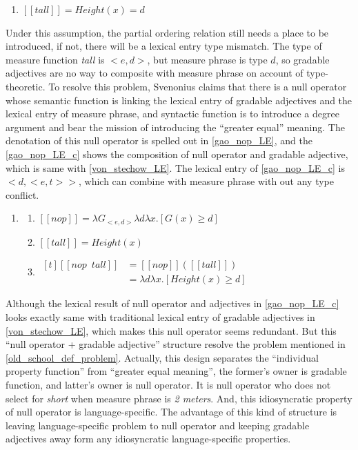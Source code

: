 \documentclass{ctexart}
\let \cite \parencite
\begin{document}
\begin{enumerate}
    \item \label{tallLE_b} 
    $[\![tall]\!]=Height(x)=d$
\end{enumerate}

Under this assumption, the partial ordering relation still needs a place to be introduced, if not, there will be a lexical entry type mismatch. The type of measure function \textit{tall} is $<e,d>$, but measure phrase is type $d$, so gradable adjectives are no way to composite with measure phrase on account of type-theoretic. To resolve this problem, Svenonius \cite{svenonius2006} claims that there is a null operator whose semantic function is linking the lexical entry of gradable adjectives and the lexical entry of measure phrase, and syntactic function is to introduce a degree argument and bear the mission of introducing the ``greater equal'' meaning. The denotation of this null operator is spelled out in \ref{gao_nop_LE}, and the \ref{gao_nop_LE_c} shows the composition of null operator and gradable adjective, which is same with \ref{von_stechow_LE}. The lexical entry of \ref{gao_nop_LE_c} is $<d,<e,t>>$, which can combine with measure phrase with out any type conflict.

\begin{enumerate}
    \item \label{gao_nop_LE}

    \begin{enumerate}
        \item \label{gao_nop_LE_a} 
        $[\![nop]\!]=\lambda G_{<e,d>}\lambda d \lambda x.[G(x) \geq d]$

        \item \label{gao_nop_LE_b} 
        $[\![tall]\!]=Height(x)$

        \item \label{gao_nop_LE_c} 
        $\begin{aligned}[t]
            [\![nop \enspace tall]\!] &= [\![nop]\!]([\![tall]\!]) \\
            &= \lambda d \lambda x.[Height(x) \geq d]
        \end{aligned}$

    \end{enumerate}
\end{enumerate}

Although the lexical result of null operator and adjectives in \ref{gao_nop_LE_c} looks exactly same with traditional lexical entry of gradable adjectives in \ref{von_stechow_LE}, which makes this null operator seems redundant. But this ``null operator + gradable adjective'' structure resolve the problem mentioned in \ref{old_school_def_problem}. Actually, this design separates the ``individual property function'' from ``greater equal meaning'', the former's owner is gradable function, and latter's owner is null operator. It is null operator who does not select for \textit{short} when measure phrase is \textit{2 meters}. And, this idiosyncratic property of null operator is language-specific. The advantage of this kind of structure is leaving language-specific problem to null operator and keeping gradable adjectives away form any idiosyncratic language-specific properties.
\end{document}
